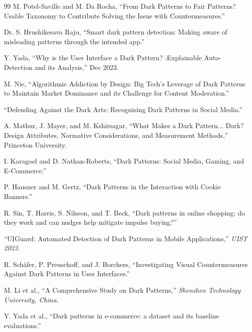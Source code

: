 \documentclass[12pt,a4paper]{article}
\begin{document}
\begin{thebibliography}{99}
M. Potel-Saville and M. Da Rocha, 
``From Dark Patterns to Fair Patterns? Usable Taxonomy to Contribute Solving the Issue with Countermeasures.''

Dr. S. Hrushikesava Raju,
``Smart dark pattern detection: Making aware of misleading patterns through the intended app.''

Y. Yada,
``Why is the User Interface a Dark Pattern? :Explainable Auto-Detection and its Analysis,'' Dec 2023.

M. Nie,
``Algorithmic Addiction by Design: Big Tech’s Leverage of Dark Patterns to Maintain Market Dominance and its Challenge for Content Moderation.''

``Defending Against the Dark Arts: Recognising Dark Patterns in Social Media.''

A. Mathur, J. Mayer, and M. Kshirsagar,
``What Makes a Dark Pattern... Dark? Design Attributes, Normative Considerations, and Measurement Methods,'' Princeton University.

I. Karagoel and D. Nathan-Roberts,
``Dark Patterns: Social Media, Gaming, and E-Commerce.''

P. Hausner and M. Gertz,
``Dark Patterns in the Interaction with Cookie Banners.''

R. Sin, T. Harris, S. Nilsson, and T. Beck,
``Dark patterns in online shopping: do they work and can nudges help mitigate impulse buying?''

``UIGuard: Automated Detection of Dark Patterns in Mobile Applications,'' \textit{UIST 2023}.

R. Schäfer, P. Preuschoff, and J. Borchers,
``Investigating Visual Countermeasures Against Dark Patterns in User Interfaces.''

M. Li et al.,
``A Comprehensive Study on Dark Patterns,'' \textit{Shenzhen Technology University, China}.

Y. Yada et al.,
``Dark patterns in e-commerce: a dataset and its baseline evaluations.''

\end{thebibliography}
\end{document}

